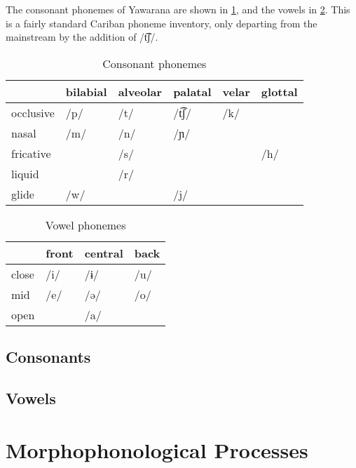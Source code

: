 \documentclass{memoir}
\begin{document}
The consonant phonemes of Yawarana are shown in \cref{tab:consonants},
and the vowels in \cref{tab:vowels}. This is a fairly standard Cariban
phoneme inventory, only departing from the mainstream by the addition of
/t͡ʃ/.

\begin{table}
\caption{Consonant phonemes}
\label{tab:consonants}
\centering
\begin{tabular}{llllll}
\toprule
          & bilabial & alveolar & palatal & velar & glottal \\
\midrule
occlusive &     /p/  &     /t/  &  /t͡ʃ/  &   /k/ &         \\
    nasal &     /m/  &     /n/  &    /ɲ/  &       &         \\
fricative &          &     /s/  &         &       &    /h/  \\
   liquid &          &     /r/  &         &       &         \\
    glide &     /w/  &          &     /j/ &       &         \\
\bottomrule
\end{tabular}

\end{table}

\begin{table}
\caption{Vowel phonemes}
\label{tab:vowels}
\centering
\begin{tabular}{llll}
\toprule
      & front & central & back \\
\midrule
close &  /i/  &    /ɨ/  & /u/  \\
  mid &  /e/  &    /ə/  & /o/  \\
 open &       &    /a/  &      \\
\bottomrule
\end{tabular}

\end{table}

\subsection{\texorpdfstring{Consonants
\label{sec:consonants}}{Consonants }}

\subsection{\texorpdfstring{Vowels \label{sec:vowels}}{Vowels }}

\section{\texorpdfstring{Morphophonological Processes
\label{sec:morphophono}}{Morphophonological Processes }}
\end{document}
